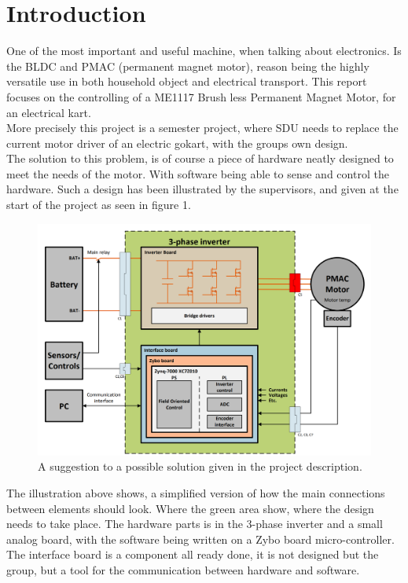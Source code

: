 \section{Introduction}
\label{sec:introduction}
One of the most important and useful machine, when talking about electronics. Is the BLDC and PMAC (permanent magnet motor), reason being the highly versatile use in both household object and electrical transport. This report focuses on the controlling of a ME1117 Brush less Permanent Magnet Motor, for an electrical kart. \\

More precisely this project is a semester project, where SDU needs to replace the current motor driver of an electric gokart, with the groups own design. \\

The solution to this problem, is of course a piece of hardware neatly designed to meet the needs of the motor. With software being able to sense and control the hardware. Such a design has been illustrated by the supervisors, and given at the start of the project as seen in figure 1. \\

\begin{figure} [H]
  \centering
  \includegraphics[width=\linewidth]{pictures/general/Project1.PNG}
  \caption{A suggestion to a possible solution given in the project description. \cite{Project 1. semester - S19}}
  \label{fig:Possiblesolution}
\end{figure}

The illustration above shows, a simplified version of how the main connections between elements should look. Where the green area show, where the design needs to take place. The hardware parts is in the 3-phase inverter and a small analog board, with the software being written on a Zybo board micro-controller. The interface board is a component all ready done, it is not designed but the group, but a tool for the communication between hardware and software.

